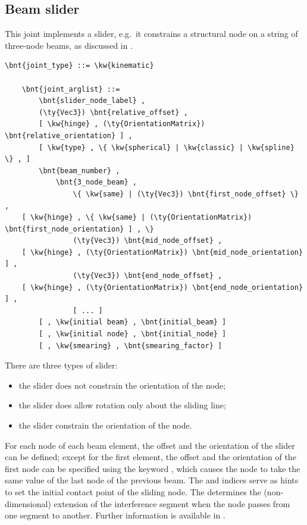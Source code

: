 \subsection{Beam slider}
This joint implements a slider, e.g.\ it constrains a structural node 
on a string of three-node beams, as discussed in \cite{SLIDER-AIDAA-2003}.
\begin{Verbatim}[commandchars=\\\{\}]
    \bnt{joint_type} ::= \kw{kinematic}

    \bnt{joint_arglist} ::=
        \bnt{slider_node_label} ,
        (\ty{Vec3}) \bnt{relative_offset} ,
        [ \kw{hinge} , (\ty{OrientationMatrix}) \bnt{relative_orientation} ] ,
        [ \kw{type} , \{ \kw{spherical} | \kw{classic} | \kw{spline} \} , ]
        \bnt{beam_number} ,
            \bnt{3_node_beam} ,
                \{ \kw{same} | (\ty{Vec3}) \bnt{first_node_offset} \} ,
    [ \kw{hinge} , \{ \kw{same} | (\ty{OrientationMatrix}) \bnt{first_node_orientation} ] , \}
                (\ty{Vec3}) \bnt{mid_node_offset} ,
    [ \kw{hinge} , (\ty{OrientationMatrix}) \bnt{mid_node_orientation} ] ,
                (\ty{Vec3}) \bnt{end_node_offset} ,
    [ \kw{hinge} , (\ty{OrientationMatrix}) \bnt{end_node_orientation} ] ,
                [ ... ]
        [ , \kw{initial beam} , \bnt{initial_beam} ]
        [ , \kw{initial node} , \bnt{initial_node} ]
        [ , \kw{smearing} , \bnt{smearing_factor} ]
\end{Verbatim}
There are three types of slider:
\begin{itemize}
	\item the  slider does not constrain
	the orientation of the node;
	\item the  slider does allow rotation
	only about the sliding line;
	\item the  slider constrain the orientation
	of the node.
\end{itemize}
For each node of each beam element, the offset and the orientation
of the slider can be defined; except for the first element, the
offset and the orientation of the first node can be specified using
the keyword , which causes the node to take the same
value of the last node of the previous beam.
The  and  indices
serve as hints to set the initial contact point of the sliding node.
The  determines the (non-dimensional) extension
of the interference segment when the node passes from one segment
to another.
Further information is available in \cite{SLIDER-AIDAA-2003}.



